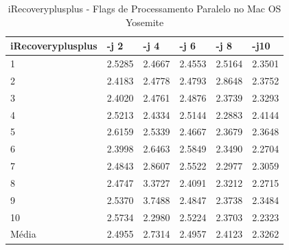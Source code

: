 \begin{table}[!ht]
\centering
\caption{iRecoveryplusplus - Flags de Processamento Paralelo no Mac OS Yosemite}
\label{tab:flag_processamento_paralelo:mac:irecoveryplusplus}
\begin{tabular}{llllll}
\textbf{iRecoveryplusplus} & \textbf{-j 2} & \textbf{-j 4} & \textbf{-j 6} & \textbf{-j 8} & \textbf{-j10}  \\ \toprule
1                          & 2.5285        &  2.4667       &  2.4553       &  2.5164       &  2.3501    \\ 
2                          & 2.4183        &  2.4778       &  2.4793       &  2.8648       &  2.3752    \\ 
3                          & 2.4020        &  2.4761       &  2.4876       &  2.3739       &  2.3293    \\ 
4                          & 2.5213        &  2.4334       &  2.5144       &  2.2883       &  2.4144    \\ 
5                          & 2.6159        &  2.5339       &  2.4667       &  2.3679       &  2.3648    \\ 
6                          & 2.3998        &  2.6463       &  2.5849       &  2.3490       &  2.2704    \\ 
7                          & 2.4843        &  2.8607       &  2.5522       &  2.2977       &  2.3059    \\ 
8                          & 2.4747        &  3.3727       &  2.4091       &  2.3212       &  2.2715    \\ 
9                          & 2.5370        &  3.7488       &  2.4847       &  2.3738       &  2.3484    \\ 
10                         & 2.5734        &  2.2980       &  2.5224       &  2.3703       &  2.2323    \\ \bottomrule
Média                      & 2.4955        &  2.7314       &  2.4957       &  2.4123       &  2.3262    \\ 
\end{tabular}
\end{table}

